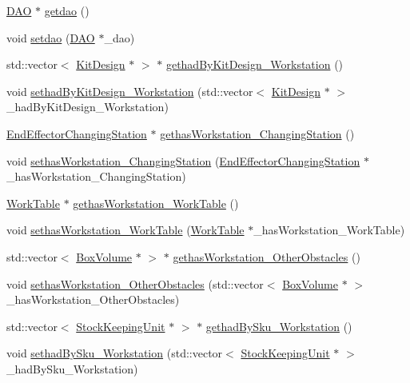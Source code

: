 \begin{DoxyCompactItemize}
\item 
\hyperlink{class_d_a_o}{DAO} $\ast$ \hyperlink{class_kitting_workstation_a0ec76e70672bb3bf0d36c0472564b276}{getdao} ()
\item 
void \hyperlink{class_kitting_workstation_aecd49f2b3ccb6289bcf873dee93faee3}{setdao} (\hyperlink{class_d_a_o}{DAO} $\ast$\_\-dao)
\item 
std::vector$<$ \hyperlink{class_kit_design}{KitDesign} $\ast$ $>$ $\ast$ \hyperlink{class_kitting_workstation_a34182fbdd47318d2bc1f97fc8b34332d}{gethadByKitDesign\_\-Workstation} ()
\item 
void \hyperlink{class_kitting_workstation_a2c35e66ed0dbd39e796944b1799ea069}{sethadByKitDesign\_\-Workstation} (std::vector$<$ \hyperlink{class_kit_design}{KitDesign} $\ast$ $>$ \_\-hadByKitDesign\_\-Workstation)
\item 
\hyperlink{class_end_effector_changing_station}{EndEffectorChangingStation} $\ast$ \hyperlink{class_kitting_workstation_a46b691ce8ee70c66b203712ad8e771d0}{gethasWorkstation\_\-ChangingStation} ()
\item 
void \hyperlink{class_kitting_workstation_aad6b9e724dc5ee615991406fd7c721cc}{sethasWorkstation\_\-ChangingStation} (\hyperlink{class_end_effector_changing_station}{EndEffectorChangingStation} $\ast$\_\-hasWorkstation\_\-ChangingStation)
\item 
\hyperlink{class_work_table}{WorkTable} $\ast$ \hyperlink{class_kitting_workstation_a5e54bb574ff7ed35b964f2ee1ce41741}{gethasWorkstation\_\-WorkTable} ()
\item 
void \hyperlink{class_kitting_workstation_a91f4cc62b8de442dedee7976cdbaea56}{sethasWorkstation\_\-WorkTable} (\hyperlink{class_work_table}{WorkTable} $\ast$\_\-hasWorkstation\_\-WorkTable)
\item 
std::vector$<$ \hyperlink{class_box_volume}{BoxVolume} $\ast$ $>$ $\ast$ \hyperlink{class_kitting_workstation_ab85dbb10e96fffbdacc87b0e2cfda3d2}{gethasWorkstation\_\-OtherObstacles} ()
\item 
void \hyperlink{class_kitting_workstation_ae6e31aadc7c4472ea38f3d1b450ea92d}{sethasWorkstation\_\-OtherObstacles} (std::vector$<$ \hyperlink{class_box_volume}{BoxVolume} $\ast$ $>$ \_\-hasWorkstation\_\-OtherObstacles)
\item 
std::vector$<$ \hyperlink{class_stock_keeping_unit}{StockKeepingUnit} $\ast$ $>$ $\ast$ \hyperlink{class_kitting_workstation_a7ec266e6f8a0e5572df4046a0d6710b9}{gethadBySku\_\-Workstation} ()
\item 
void \hyperlink{class_kitting_workstation_a9392663b43e453f70747cf7c3d4df2fa}{sethadBySku\_\-Workstation} (std::vector$<$ \hyperlink{class_stock_keeping_unit}{StockKeepingUnit} $\ast$ $>$ \_\-hadBySku\_\-Workstation)

\end{DoxyCompactItemize}
